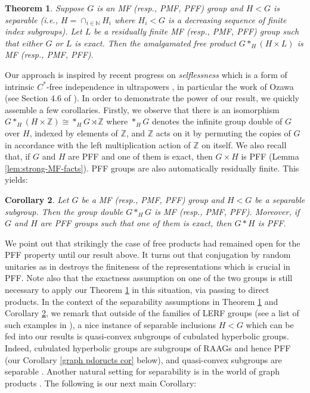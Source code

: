 \documentclass[10pt]{amsart}
\newtheorem{thm}{Theorem}[section]
\newtheorem{col}[thm]{Corollary}
\theoremstyle{definition}
\newcommand{\N}{\ensuremath{\mathbb{N}}}
\newcommand{\Z}{\ensuremath{\mathbb{Z}}}
\begin{document}
\begin{thm}\label{thm:1.1}
    Suppose $G$ is an MF (resp., PMF, PFF) group and $H<G$ is separable (i.e., $H=\cap_{i\in \N}H_i$ where $H_i<G$ is a decreasing sequence of finite index subgroups). Let $L$ be a residually finite MF (resp., PMF, PFF) group such that either $G$ or $L$ is exact. Then the amalgamated free product $G*_{H}(H\times L)$ is MF (resp., PMF, PFF).
\end{thm}

Our approach is inspired by recent progress on \emph{selflessness} which is a form of intrinsic $C^*$-free independence in ultrapowers \cite{robertselfless, amrutam2025strictcomparisonreducedgroup, ozawa2025proximalityselflessnessgroupcalgebras}, in particular the work of Ozawa (see Section 4.6 of \cite{brown2008textrm}). In order to demonstrate the power of our result, we quickly assemble a few corollaries. Firstly, we observe that there is an isomorphism $G\ast_H (H\times\mathbb{Z}) \cong \ast_H G\rtimes \mathbb{Z}$ where $*_H G$ denotes the infinite group double of $G$ over $H$, indexed by elements of $\Z$, and $\Z$ acts on it by permuting the copies of $G$ in accordance with the left multiplication action of $\Z$ on itself. We also recall that, if $G$ and $H$ are PFF and one of them is exact, then $G \times H$ is PFF (Lemma \ref{lem:strong-MF-facts}). PFF groups are also automatically residually finite. This yields:

\begin{col}\label{col:1.2}
    Let $G$ be a MF (resp., PMF, PFF) group and $H<G$ be a separable subgroup. Then the group double $G*_HG$ is MF (resp., PMF, PFF). Moreover, if $G$ and $H$ are PFF groups such that one of them is exact, then $G*H$ is PFF. 
\end{col}

We point out that strikingly the case of free products had remained open for the PFF property until our result above. It turns out that conjugation by random unitaries as in \cite{collins2014strong} destroys the finiteness of the representations which is crucial in PFF.  Note also that the exactness assumption on one of the two groups is still necessary to apply our Theorem \ref{thm:1.1} in this situation, via passing to direct products.  In the context of the separability assumptions in Theorem \ref{thm:1.1} and Corollary \ref{col:1.2}, we remark that outside of the families of LERF groups (see a list of such examples in \cite{Gao2025}), a nice instance of separable inclusions $H<G$ which can be fed into our results is quasi-convex subgroups of cubulated hyperbolic groups. Indeed, cubulated hyperbolic groups are subgroups of RAAGs \cite{Agol2013} and hence PFF (our Corollary \ref{graph pdoructs cor} below), and quasi-convex subgroups are separable \cite{HaglundWise2008}. Another natural setting for separability is in the world of graph products \cite{HsuWise1999}. The following is our next main Corollary:
\end{document}
